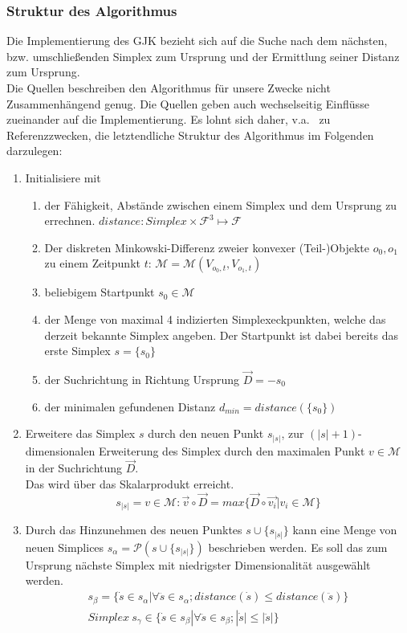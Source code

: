 \subsubsection{Struktur des Algorithmus}
Die Implementierung des GJK bezieht sich auf die Suche nach dem nächsten, bzw. umschließenden Simplex zum Ursprung und der Ermittlung seiner Distanz zum Ursprung.\\
Die Quellen \cites{gjk}{gjk-casey} beschreiben den Algorithmus für unsere Zwecke nicht Zusammenhängend genug. Die Quellen geben auch wechselseitig Einflüsse zueinander auf die Implementierung. Es lohnt sich daher, v.a.~ zu Referenzzwecken, die letztendliche Struktur des Algorithmus im Folgenden darzulegen:
\begin{enumerate}
	\item Initialisiere mit
	\begin{enumerate}
		\item der Fähigkeit, Abstände zwischen einem Simplex und dem Ursprung zu errechnen.  $distance: Simplex \times \mathcal{F}^3 \mapsto \mathcal{F}$
		\item Der diskreten Minkowski-Differenz zweier konvexer (Teil-)Objekte $o_0, o_1$ zu einem Zeitpunkt $t$: $\mathcal{M} = \mathcal{M}(V_{o_0, t}, V_{o_1, t})$
		\item beliebigem Startpunkt $s_0 \in \mathcal{M}$
		\item der Menge von maximal 4 indizierten Simplexeckpunkten, welche das derzeit bekannte Simplex angeben. Der Startpunkt ist dabei bereits das erste Simplex $s = \{s_0\}$
		\item der Suchrichtung in Richtung Ursprung $\vec{D} = -s_0$
		\item der minimalen gefundenen Distanz $d_{min} = distance(\{s_0\})$
		
	\end{enumerate}	
	\item \label{gjkstep2} \label{gjkbody} Erweitere das Simplex $s$ durch den neuen Punkt $s_{|s|}$, zur $(|s|+1)$-dimensionalen Erweiterung des Simplex durch den maximalen Punkt $v \in \mathcal{M}$ in der Suchrichtung $\vec{D}$.\\
	Das wird über das Skalarprodukt erreicht. 
	$$s_{|s|} = v \in \mathcal{M} : \vec{v} \circ \vec{D} = max\{\vec{D} \circ \vec{v_i}| v_i \in  \mathcal{M}\}$$

	\item \label{gjkstep3} Durch das Hinzunehmen des neuen Punktes $s \cup \{s_{|s|}\}$ kann eine Menge von neuen Simplices $s_{\alpha}=\mathcal{P}(s \cup \{s_{|s|}\})$ beschrieben werden. Es soll das zum Ursprung nächste Simplex mit niedrigster Dimensionalität ausgewählt werden.
	\begin{align*}
	s_{\beta} = \{\dot{s}\in s_{\alpha} | \forall \ddot{s} \in s_{\alpha}; distance(\dot{s}) \leq distance(\ddot{s})\} \\
	Simplex~s_{\gamma} \in \{\dot{s}\in s_{\beta} | \forall \ddot{s} \in s_{\beta}; |\dot{s}| \leq |\ddot{s}|\} \\
	\end{align*}
	

\end{enumerate}
